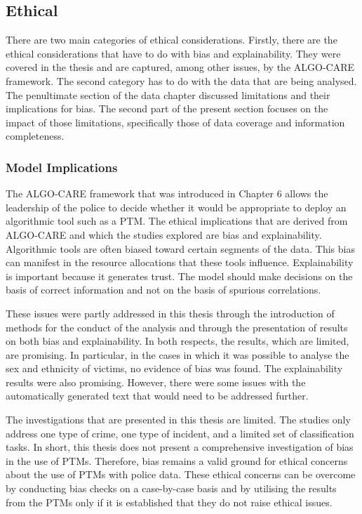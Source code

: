 \subsection{Ethical} There are two main categories of ethical considerations. Firstly, there are the ethical considerations that have to do with bias and explainability. They were covered in the thesis and are captured, among other issues, by the ALGO-CARE framework. The second category has to do with the data that are being analysed. The penultimate section of the data chapter discussed limitations and their implications for bias. The second part of the present section focuses on the impact of those limitations, specifically those of data coverage and information completeness.

\subsubsection{Model Implications}  The ALGO-CARE framework that was introduced in Chapter 6 allows the leadership of the police to decide whether it would be appropriate to deploy an algorithmic tool such as a PTM. The ethical implications that are derived from ALGO-CARE and which the studies explored are bias and explainability. Algorithmic tools are often biased toward certain segments of the data. This bias can manifest in the resource allocations that these tools influence. Explainability is important because it generates trust. The model should make decisions on the basis of correct information and not on the basis of spurious correlations.  

These issues were partly addressed in this thesis through the introduction of methods for the conduct of the analysis and through the presentation of results on both bias and explainability. In both respects, the results, which are limited, are promising. In particular, in the cases in which it was possible to analyse the sex and ethnicity of victims, no evidence of bias was found. The explainability results were also promising. However, there were some issues with the automatically generated text that would need to be addressed further.

The investigations that are presented in this thesis are limited. The studies only address one type of crime, one type of incident, and a limited set of classification tasks. In short, this thesis does not present a comprehensive investigation of bias in the use of PTMs. Therefore, bias remains a valid ground for ethical concerns about the use of PTMs with police data. These ethical concerns can be overcome by conducting bias checks on a case-by-case basis and by utilising the results from the PTMs only if it is established that they do not raise ethical issues.

